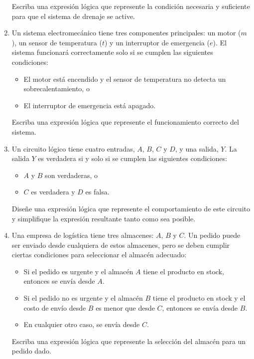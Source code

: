 \begin{enumerate}[label=\textbf{\arabic*}.]
	Escriba una expresión lógica que represente la condición necesaria y suficiente para que el sistema de drenaje se active.
	
	\item Un sistema electromecánico tiene tres componentes principales: un motor ($m$), un sensor de temperatura ($t$) y un interruptor de emergencia ($e$). El sistema funcionará correctamente solo si se cumplen las siguientes condiciones:
	
	\begin{itemize}[itemsep=-3pt]
		\item El motor está encendido y el sensor de temperatura no detecta un sobrecalentamiento, o
		\item El interruptor de emergencia está apagado.
	\end{itemize}
	
	Escriba una expresión lógica que represente el funcionamiento correcto del sistema.
	
	\item Un circuito lógico tiene cuatro entradas, $A$, $B$, $C$ y $D$, y una salida, $Y$. La salida $Y$ es verdadera si y solo si se cumplen las siguientes condiciones:
	
	\begin{itemize}[itemsep=-3pt]
		\item $A$ y $B$ son verdaderas, o
		\item $C$ es verdadera y $D$ es falsa.
	\end{itemize}
	
	Diseñe una expresión lógica que represente el comportamiento de este circuito y simplifique la expresión resultante tanto como sea posible.
	
	\item Una empresa de logística tiene tres almacenes: $A$, $B$ y $C$. Un pedido puede ser enviado desde cualquiera de estos almacenes, pero se deben cumplir ciertas condiciones para seleccionar el almacén adecuado:
	
	\begin{itemize}[itemsep=-3pt]
		\item Si el pedido es urgente y el almacén $A$ tiene el producto en stock, entonces se envía desde $A$.
		\item Si el pedido no es urgente y el almacén $B$ tiene el producto en stock y el costo de envío desde $B$ es menor que desde $C$, entonces se envía desde $B$.
		\item En cualquier otro caso, se envía desde $C$.
	\end{itemize}
	Escriba una expresión lógica que represente la selección del almacén para un pedido dado.
	

\end{enumerate}
